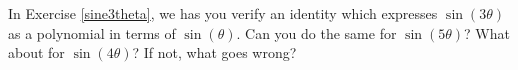 {In Exercise \ref{sine3theta}, we has you verify an identity which expresses $\sin(3\theta)$ as a polynomial in terms of $\sin(\theta)$.   Can you do the same for  $\sin(5\theta)$?  What about for $\sin(4\theta)$?  If not, what goes wrong?}
{}
